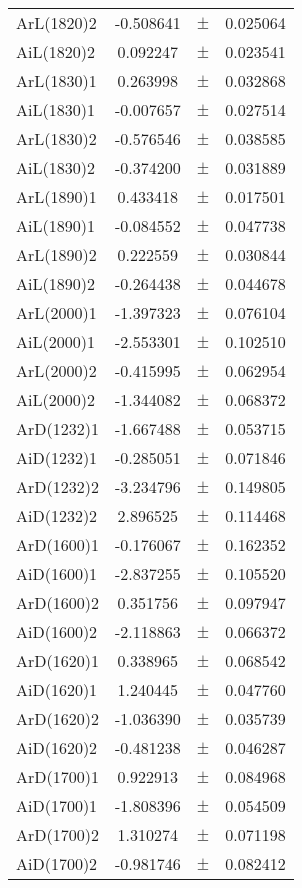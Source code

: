 \begin{table}
\begin{tiny}
\begin{tabular}{lccc}
ArL(1820)2 & -0.508641 & $\pm$ & 0.025064 \\
AiL(1820)2 & 0.092247 & $\pm$ & 0.023541 \\
ArL(1830)1 & 0.263998 & $\pm$ & 0.032868 \\
AiL(1830)1 & -0.007657 & $\pm$ & 0.027514 \\
ArL(1830)2 & -0.576546 & $\pm$ & 0.038585 \\
AiL(1830)2 & -0.374200 & $\pm$ & 0.031889 \\
ArL(1890)1 & 0.433418 & $\pm$ & 0.017501 \\
AiL(1890)1 & -0.084552 & $\pm$ & 0.047738 \\
ArL(1890)2 & 0.222559 & $\pm$ & 0.030844 \\
AiL(1890)2 & -0.264438 & $\pm$ & 0.044678 \\
ArL(2000)1 & -1.397323 & $\pm$ & 0.076104 \\
AiL(2000)1 & -2.553301 & $\pm$ & 0.102510 \\
ArL(2000)2 & -0.415995 & $\pm$ & 0.062954 \\
AiL(2000)2 & -1.344082 & $\pm$ & 0.068372 \\
ArD(1232)1 & -1.667488 & $\pm$ & 0.053715 \\
AiD(1232)1 & -0.285051 & $\pm$ & 0.071846 \\
ArD(1232)2 & -3.234796 & $\pm$ & 0.149805 \\
AiD(1232)2 & 2.896525 & $\pm$ & 0.114468 \\
ArD(1600)1 & -0.176067 & $\pm$ & 0.162352 \\
AiD(1600)1 & -2.837255 & $\pm$ & 0.105520 \\
ArD(1600)2 & 0.351756 & $\pm$ & 0.097947 \\
AiD(1600)2 & -2.118863 & $\pm$ & 0.066372 \\
ArD(1620)1 & 0.338965 & $\pm$ & 0.068542 \\
AiD(1620)1 & 1.240445 & $\pm$ & 0.047760 \\
ArD(1620)2 & -1.036390 & $\pm$ & 0.035739 \\
AiD(1620)2 & -0.481238 & $\pm$ & 0.046287 \\
ArD(1700)1 & 0.922913 & $\pm$ & 0.084968 \\
AiD(1700)1 & -1.808396 & $\pm$ & 0.054509 \\
ArD(1700)2 & 1.310274 & $\pm$ & 0.071198 \\
AiD(1700)2 & -0.981746 & $\pm$ & 0.082412 \\
\bottomrule
\end{tabular}
\end{tiny}
\end{table}

